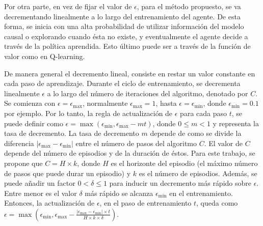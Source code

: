 Por otra parte, en vez de fijar el valor de $\epsilon$, para el método propuesto, se 
va decrementando linealmente a lo largo del entrenamiento del agente. De esta forma,
se inicia con una alta probabilidad de utilizar información del modelo causal o
explorando cuando ésta no existe, y eventualmente el agente decide a través de la
política aprendida. Esto último puede ser a través de la función de valor como en Q-learning.

De manera general el decremento lineal, consiste en restar un valor constante en cada paso
de aprendizaje.
Durante el ciclo de entrenamiento, se decrementa linealmente $\epsilon$ a lo largo del número
de iteraciones del algoritmo, denotado por $C$. Se comienza con $\epsilon = \epsilon_{\max}$, normalmente $\epsilon_{\max} = 1$, hasta $\epsilon = \epsilon_{\min}$, donde $\epsilon_{\min}=0.1$ por ejemplo. 
Por lo tanto, la regla de actualización de $\epsilon$ para cada paso $t$, se puede definir como
$\epsilon = \max(\epsilon_{\min}, \epsilon_{\max} - m t)$, donde $0 \leq m < 1$ y representa la tasa de decremento. La tasa de decremento $m$ depende de como se divide la diferencia $|\epsilon_{\max} - \epsilon_{\min}|$ entre el número de pasos del algoritmo $C$. El valor de $C$ depende del número de episodios y de la duración de éstos. Para este trabajo, se propone que $C = H \times k$, donde $H$ es el horizonte del episodio (el máximo número de pasos que puede durar un episodio) y $k$ es el número de episodios. Además, se puede añadir un factor $0 < \delta \leq 1$ para inducir un decremento más rápido sobre $\epsilon$. Entre menor es el valor $\delta$
más rápido se alcanza $\epsilon_{\min}$ en el entrenamiento. Entonces, la actualización de $\epsilon$, en el paso de entrenamiento $t$, queda como $\epsilon = \max(\epsilon_{\min}, \epsilon_{\max} - \frac{|\epsilon_{\max} - \epsilon_{\min}| \times t}{H \times k \times \delta})$.



